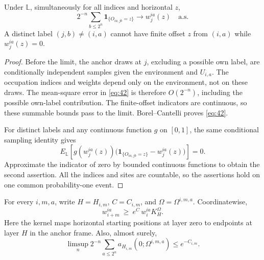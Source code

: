 \begin{lemma}\label{profile-sampling}
Under \(\mathbb L\), simultaneously for all indices and horizontal
\(z\),
\[
2^{-n}\sum_{b\le2^n}\mathbf1_{\{O_{ia,jb}=z\}}\longrightarrow w_j^{ia}(z)\quad\text{a.s.}
\tag{42}\label{eq:42}
\]
A distinct label \((j,b)\ne(i,a)\) cannot have finite offset \(z\)
from \((i,a)\) while \(w_j^{ia}(z)=0\).
\end{lemma}

\begin{proof}
Before the limit, the anchor draws at \(j\), excluding a possible
own label, are conditionally independent samples given the environment
and \(U_{i,a}\). The occupation indices and weights depend only on
the environment, not on these draws. The mean-square error in
\eqref{eq:42} is therefore \(O(2^{-n})\), including the possible
own-label contribution. The finite-offset indicators are continuous,
so these summable bounds pass to the limit. Borel--Cantelli proves
\eqref{eq:42}.

For distinct labels and any continuous function \(g\) on \([0,1]\),
the same conditional sampling identity gives
\[
E_{\mathbb L}\!\left[
g(w_j^{ia}(z))
\bigl(\mathbf1_{\{O_{ia,jb}=z\}}-w_j^{ia}(z)\bigr)\right]=0.
\]
Approximate the indicator of zero by bounded continuous functions
to obtain the second assertion. All the indices and sites are
countable, so the assertions hold on one common probability-one event.
\end{proof}

\begin{lemma}\label{profile-updates}
For every \(i,m,a\), write \(H=H_{i,m}\), \(C=C_{i,m}\), and
\(\Omega=\Omega^{i,m,a}\). Coordinatewise,
\[
w_{i+m}^{ia}\ \ge\ e^C\, w_i^{ia} K_H^\Omega .
\tag{43}\label{eq:43}
\]
Here the kernel maps horizontal starting positions at layer zero to
endpoints at layer \(H\) in the anchor frame. Also, almost surely,
\[
\limsup_n 2^{-n}\sum_{a\le2^n} a_{H_{i,m}}(0;\Omega^{i,m,a})\le e^{-C_{i,m}}.
\tag{44}\label{eq:44}
\]
\end{lemma}

